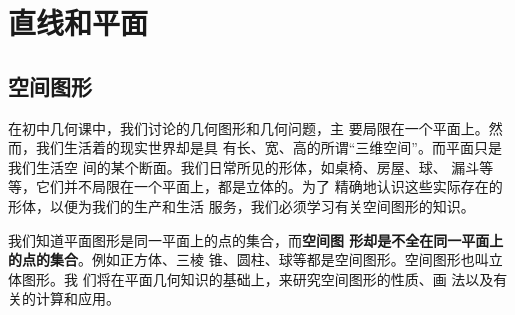 \chapter{直线和平面}
\section{空间图形}
在初中几何课中，我们讨论的几何图形和几何问题，主
要局限在一个平面上。然而，我们生活着的现实世界却是具
有长、宽、高的所谓“三维空间”。而平面只是我们生活空
间的某个断面。我们日常所见的形体，如桌椅、房屋、球、
漏斗等等，它们并不局限在一个平面上，都是立体的。为了
精确地认识这些实际存在的形体，以便为我们的生产和生活
服务，我们必须学习有关空间图形的知识。

我们知道平面图形是同一平面上的点的集合，而\textbf{空间图
形却是不全在同一平面上的点的集合}。例如正方体、三棱
锥、圆柱、球等都是空间图形。空间图形也叫立体图形。我
们将在平面几何知识的基础上，来研究空间图形的性质、画
法以及有关的计算和应用。

